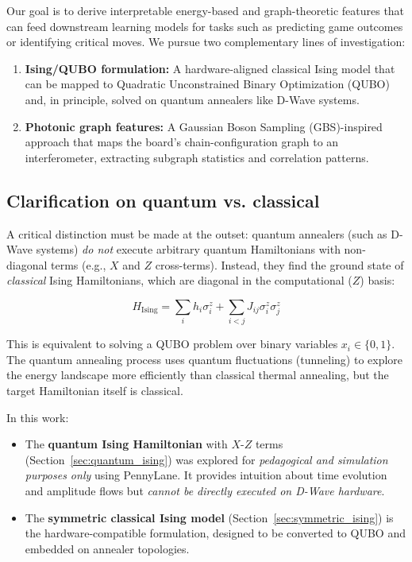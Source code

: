 \documentclass[aps,prl,reprint]{revtex4-2}
\begin{document}
Our goal is to derive interpretable energy-based and graph-theoretic features that can feed downstream learning models for tasks such as predicting game outcomes or identifying critical moves. We pursue two complementary lines of investigation:

\begin{enumerate}
	\item \textbf{Ising/QUBO formulation:} A hardware-aligned classical Ising model that can be mapped to Quadratic Unconstrained Binary Optimization (QUBO) and, in principle, solved on quantum annealers like D-Wave systems.
	
	\item \textbf{Photonic graph features:} A Gaussian Boson Sampling (GBS)-inspired approach that maps the board's chain-configuration graph to an interferometer, extracting subgraph statistics and correlation patterns.
\end{enumerate}

\subsection{Clarification on quantum vs. classical}

A critical distinction must be made at the outset: quantum annealers (such as D-Wave systems) \textit{do not} execute arbitrary quantum Hamiltonians with non-diagonal terms (e.g., $X$ and $Z$ cross-terms). Instead, they find the ground state of \textit{classical} Ising Hamiltonians, which are diagonal in the computational ($Z$) basis:

\begin{equation}
H_{\text{Ising}} = \sum_i h_i \sigma^z_i + \sum_{i<j} J_{ij} \sigma^z_i \sigma^z_j
\end{equation}

This is equivalent to solving a QUBO problem over binary variables $x_i \in \{0,1\}$. The quantum annealing process uses quantum fluctuations (tunneling) to explore the energy landscape more efficiently than classical thermal annealing, but the target Hamiltonian itself is classical.

In this work:
\begin{itemize}
	\item The \textbf{quantum Ising Hamiltonian} with $X$-$Z$ terms (Section~\ref{sec:quantum_ising}) was explored for \textit{pedagogical and simulation purposes only} using PennyLane. It provides intuition about time evolution and amplitude flows but \textit{cannot be directly executed on D-Wave hardware}.
	
	\item The \textbf{symmetric classical Ising model} (Section~\ref{sec:symmetric_ising}) is the hardware-compatible formulation, designed to be converted to QUBO and embedded on annealer topologies.
\end{itemize}
\end{document}
